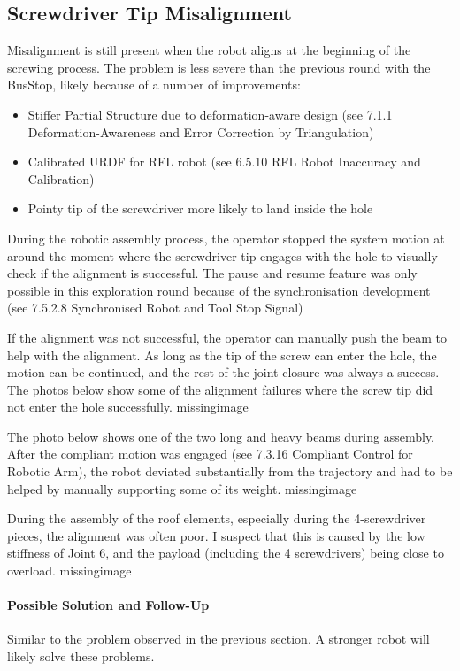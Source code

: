 \subsection{Screwdriver Tip Misalignment}
\label{subsection:exploration_4_screwdriver_tip_misalignment}

Misalignment is still present when the robot aligns at the beginning of the screwing process. The problem is less severe than the previous round with the BusStop, likely because of a number of improvements:
\begin{itemize}
    \item Stiffer Partial Structure due to deformation-aware design (see 7.1.1 Deformation-Awareness and Error Correction by Triangulation)
    \item Calibrated URDF for RFL robot (see 6.5.10 RFL Robot Inaccuracy and Calibration)
    \item Pointy tip of the screwdriver more likely to land inside the hole
\end{itemize}

During the robotic assembly process, the operator stopped the system motion at around the moment where the screwdriver tip engages with the hole to visually check if the alignment is successful. The pause and resume feature was only possible in this exploration round because of the synchronisation development (see 7.5.2.8 Synchronised Robot and Tool Stop Signal)

If the alignment was not successful, the operator can manually push the beam to help with the alignment. As long as the tip of the screw can enter the hole, the motion can be continued, and the rest of the joint closure was always a success. The photos below show some of the alignment failures where the screw tip did not enter the hole successfully. 
missingimage

The photo below shows one of the two long and heavy beams during assembly. After the compliant motion was engaged (see 7.3.16 Compliant Control for Robotic Arm), the robot deviated substantially from the trajectory and had to be helped by manually supporting some of its weight.
missingimage

During the assembly of the roof elements, especially during the 4-screwdriver pieces, the alignment was often poor. I suspect that this is caused by the low stiffness of Joint 6, and the payload (including the 4 screwdrivers) being close to overload. 
missingimage

\paragraph{Possible Solution and Follow-Up}
Similar to the problem observed in the previous section. A stronger robot will likely solve these problems.

